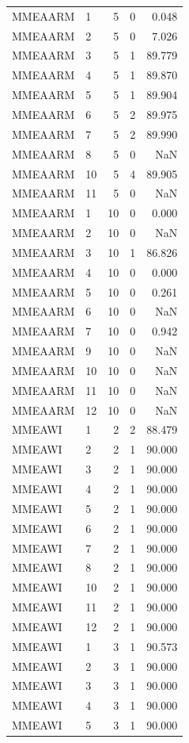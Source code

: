\begin{longtable}{llrrr}
MMEAARM & 1 & 5 & 0 & 0.048 \\
MMEAARM & 2 & 5 & 0 & 7.026 \\
MMEAARM & 3 & 5 & 1 & 89.779 \\
MMEAARM & 4 & 5 & 1 & 89.870 \\
MMEAARM & 5 & 5 & 1 & 89.904 \\
MMEAARM & 6 & 5 & 2 & 89.975 \\
MMEAARM & 7 & 5 & 2 & 89.990 \\
MMEAARM & 8 & 5 & 0 & NaN \\
MMEAARM & 10 & 5 & 4 & 89.905 \\
MMEAARM & 11 & 5 & 0 & NaN \\
MMEAARM & 1 & 10 & 0 & 0.000 \\
MMEAARM & 2 & 10 & 0 & NaN \\
MMEAARM & 3 & 10 & 1 & 86.826 \\
MMEAARM & 4 & 10 & 0 & 0.000 \\
MMEAARM & 5 & 10 & 0 & 0.261 \\
MMEAARM & 6 & 10 & 0 & NaN \\
MMEAARM & 7 & 10 & 0 & 0.942 \\
MMEAARM & 9 & 10 & 0 & NaN \\
MMEAARM & 10 & 10 & 0 & NaN \\
MMEAARM & 11 & 10 & 0 & NaN \\
MMEAARM & 12 & 10 & 0 & NaN \\
MMEAWI & 1 & 2 & 2 & 88.479 \\
MMEAWI & 2 & 2 & 1 & 90.000 \\
MMEAWI & 3 & 2 & 1 & 90.000 \\
MMEAWI & 4 & 2 & 1 & 90.000 \\
MMEAWI & 5 & 2 & 1 & 90.000 \\
MMEAWI & 6 & 2 & 1 & 90.000 \\
MMEAWI & 7 & 2 & 1 & 90.000 \\
MMEAWI & 8 & 2 & 1 & 90.000 \\
MMEAWI & 10 & 2 & 1 & 90.000 \\
MMEAWI & 11 & 2 & 1 & 90.000 \\
MMEAWI & 12 & 2 & 1 & 90.000 \\
MMEAWI & 1 & 3 & 1 & 90.573 \\
MMEAWI & 2 & 3 & 1 & 90.000 \\
MMEAWI & 3 & 3 & 1 & 90.000 \\
MMEAWI & 4 & 3 & 1 & 90.000 \\
MMEAWI & 5 & 3 & 1 & 90.000 \\

\end{longtable}
